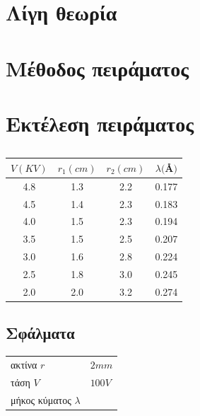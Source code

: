 \documentclass[a4paper,12pt,titlepage]{article}
\begin{document}
\section{Λίγη θεωρία}




\section{Μέθοδος πειράματος}




\section{Εκτέλεση πειράματος}

\begin{table}[H]
\begin{center}
\begin{tabular}{ | c | c | c | c|}
\hline
$V (KV)$ & $r_{1} (cm)$ & $r_{2} (cm)$ & $\lambda ($\AA$ ) $ \\ \hline
4.8 & 1.3 & 2.2 & 0.177 \\ \hline
4.5 & 1.4 & 2.3 & 0.183 \\ \hline
4.0 & 1.5 & 2.3 & 0.194 \\ \hline
3.5 & 1.5 & 2.5 & 0.207 \\ \hline
3.0 & 1.6 & 2.8 & 0.224 \\ \hline
2.5 & 1.8 & 3.0 & 0.245 \\ \hline
2.0 & 2.0 & 3.2 & 0.274 \\ \hline
\end{tabular}
\end{center}
\caption{}
\end{table}


\subsection{Σφάλματα}

\begin{tabular}{l | l}
\hline
ακτίνα $r$ & $2mm$ \\
τάση $V$  &  $100V$\\
μήκος κύματος $\lambda$ & \\
\hline
\end{tabular}
\end{document}
